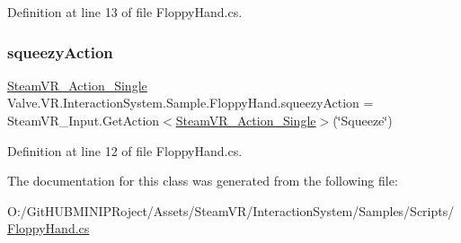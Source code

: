 Definition at line 13 of file Floppy\+Hand.\+cs.

\mbox{\label{class_valve_1_1_v_r_1_1_interaction_system_1_1_sample_1_1_floppy_hand_ab523fc013ed2eeaa22a1f8d4aa6882b0}} 
\subsubsection{\texorpdfstring{squeezyAction}{squeezyAction}}
{\footnotesize\ttfamily \mbox{\hyperlink{class_valve_1_1_v_r_1_1_steam_v_r___action___single}{Steam\+V\+R\+\_\+\+Action\+\_\+\+Single}} Valve.\+V\+R.\+Interaction\+System.\+Sample.\+Floppy\+Hand.\+squeezy\+Action = Steam\+V\+R\+\_\+\+Input.\+Get\+Action$<$\mbox{\hyperlink{class_valve_1_1_v_r_1_1_steam_v_r___action___single}{Steam\+V\+R\+\_\+\+Action\+\_\+\+Single}}$>$(\char`\"{}Squeeze\char`\"{})}



Definition at line 12 of file Floppy\+Hand.\+cs.



The documentation for this class was generated from the following file\+:\begin{DoxyCompactItemize}
\item 
O\+:/\+Git\+H\+U\+B\+M\+I\+N\+I\+P\+Roject/\+Assets/\+Steam\+V\+R/\+Interaction\+System/\+Samples/\+Scripts/\mbox{\hyperlink{_floppy_hand_8cs}{Floppy\+Hand.\+cs}}\end{DoxyCompactItemize}
